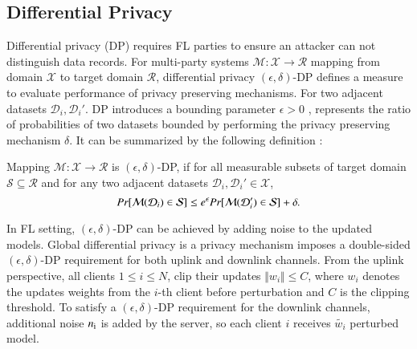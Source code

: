 \subsection{Differential Privacy}\label{sec:Differential Privacy}



 Differential privacy (DP) requires FL parties to ensure an attacker can not distinguish data records. For multi-party systems $\mathcal M: \mathcal{X}\rightarrow \mathcal{R}$ mapping from domain $\mathcal{X}$ to target domain $\mathcal{R}$, differential privacy  $(\epsilon, \delta)$-DP defines a measure to evaluate  performance of privacy preserving mechanisms.
For two adjacent datasets $\mathcal D_i, \mathcal D_i'$. DP introduces a bounding parameter $\epsilon > 0$ , represents the ratio of probabilities of two datasets bounded by performing the privacy preserving mechanism  $\delta$. It can be summarized by the following definition \cite{dwork2014algorithmic}:
 
\begin{definition}
Mapping $\mathcal M: \mathcal{X}\rightarrow \mathcal{R}$ is $(\epsilon, \delta)$-DP,
if for all measurable subsets of target domain $\mathcal S\subseteq \mathcal{R}$ and for any two adjacent datasets $\mathcal D_i, \mathcal D_i'\in \mathcal{X}$, 
\begin{equation}\label{equ:Differential privacy}
\emph{Pr}[\mathcal M(\mathcal D_i)\in \mathcal S]\leq e^{\epsilon}\emph{Pr}[\mathcal M(\mathcal D_i')\in \mathcal S]+\delta.
\end{equation}
\end{definition}
In FL setting,  $(\epsilon, \delta)$-DP can be achieved by adding noise to the updated models.
Global differential privacy is a privacy mechanism imposes a double-sided $(\epsilon, \delta)$-DP requirement for both uplink and downlink channels\cite{wei2020federated}.
From the uplink perspective, all clients $1\leq i\leq N$, clip their updates  $\Vert{w}_{i}\Vert \leq C$, where ${w}_{i}$ denotes the updates weights from the $i$-th client before perturbation and $C$ is the clipping threshold. To satisfy a $(\epsilon, \delta)$-DP requirement for the downlink channels, additional noise ${n}_{\text i}$ is   added by the server, so each client $i$ receives $\tilde{w_i}$ perturbed model\cite{wei2020federated}.

